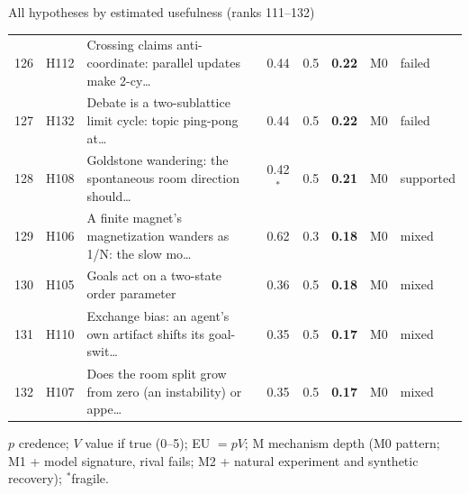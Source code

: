 \begin{frame}{All hypotheses by estimated usefulness (ranks 111--132)}
{\begin{tabular}{@{}rl>{\raggedright\arraybackslash}p{}ccccl@{}}
126 & H112 & Crossing claims anti-coordinate: parallel updates make 2-cy\ldots & 0.44 & 0.5 & \textbf{0.22} & M0 & failed\\
127 & H132 & Debate is a two-sublattice limit cycle: topic ping-pong at\ldots & 0.44 & 0.5 & \textbf{0.22} & M0 & failed\\
128 & H108 & Goldstone wandering: the spontaneous room direction should\ldots & 0.42$^\ast$ & 0.5 & \textbf{0.21} & M0 & supported\\
129 & H106 & A finite magnet's magnetization wanders as 1/N: the slow mo\ldots & 0.62 & 0.3 & \textbf{0.18} & M0 & mixed\\
130 & H105 & Goals act on a two-state order parameter & 0.36 & 0.5 & \textbf{0.18} & M0 & mixed\\
131 & H110 & Exchange bias: an agent's own artifact shifts its goal-swit\ldots & 0.35 & 0.5 & \textbf{0.17} & M0 & mixed\\
132 & H107 & Does the room split grow from zero (an instability) or appe\ldots & 0.35 & 0.5 & \textbf{0.17} & M0 & mixed\\
\end{tabular}}\par\vspace{0.2em}
{\tiny\color{muted}$p$ credence; $V$ value if true (0--5); EU $=pV$; M mechanism depth (M0 pattern; M1 + model signature, rival fails; M2 + natural experiment and synthetic recovery); $^\ast$fragile.}
\end{frame}
